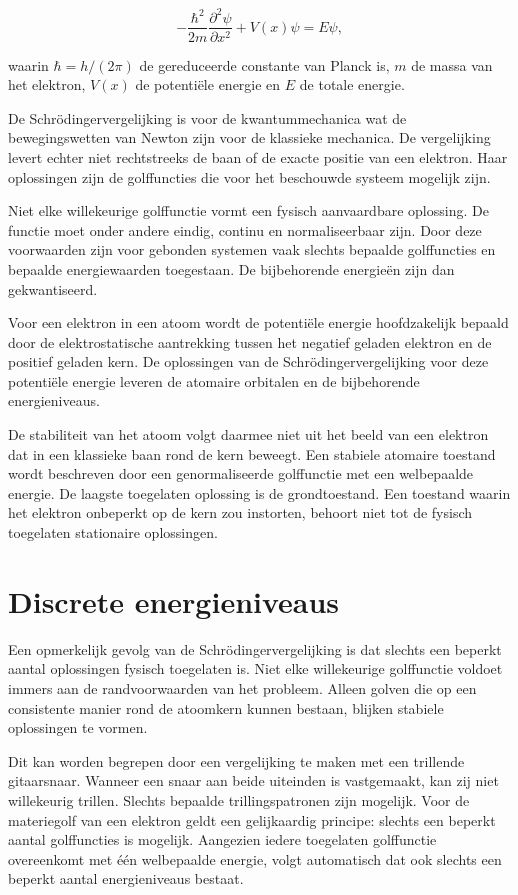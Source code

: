 \begin{equation}
\boxed{
-\frac{\hbar^2}{2m}
\frac{\partial^2\psi}{\partial x^2}
+
V(x)\psi
=
E\psi,
}
\end{equation}

waarin $\hbar=h/(2\pi)$ de gereduceerde constante van Planck is, $m$ de massa van het elektron, $V(x)$ de potentiële energie en $E$ de totale energie.

De Schr\"odingervergelijking is voor de kwantummechanica wat de bewegingswetten van Newton zijn voor de klassieke mechanica. De vergelijking levert echter niet rechtstreeks de baan of de exacte positie van een elektron. Haar oplossingen zijn de golffuncties die voor het beschouwde systeem mogelijk zijn.

Niet elke willekeurige golffunctie vormt een fysisch aanvaardbare oplossing. De functie moet onder andere eindig, continu en normaliseerbaar zijn. Door deze voorwaarden zijn voor gebonden systemen vaak slechts bepaalde golffuncties en bepaalde energiewaarden toegestaan. De bijbehorende energieën zijn dan gekwantiseerd.

Voor een elektron in een atoom wordt de potentiële energie hoofdzakelijk bepaald door de elektrostatische aantrekking tussen het negatief geladen elektron en de positief geladen kern. De oplossingen van de Schr\"odingervergelijking voor deze potentiële energie leveren de atomaire orbitalen en de bijbehorende energieniveaus.

De stabiliteit van het atoom volgt daarmee niet uit het beeld van een elektron dat in een klassieke baan rond de kern beweegt. Een stabiele atomaire toestand wordt beschreven door een genormaliseerde golffunctie met een welbepaalde energie. De laagste toegelaten oplossing is de grondtoestand. Een toestand waarin het elektron onbeperkt op de kern zou instorten, behoort niet tot de fysisch toegelaten stationaire oplossingen.

\section{Discrete energieniveaus}

Een opmerkelijk gevolg van de Schr\"odingervergelijking is dat slechts een beperkt aantal oplossingen fysisch toegelaten is. Niet elke willekeurige golffunctie voldoet immers aan de randvoorwaarden van het probleem. Alleen golven die op een consistente manier rond de atoomkern kunnen bestaan, blijken stabiele oplossingen te vormen.

Dit kan worden begrepen door een vergelijking te maken met een trillende gitaarsnaar. Wanneer een snaar aan beide uiteinden is vastgemaakt, kan zij niet willekeurig trillen. Slechts bepaalde trillingspatronen zijn mogelijk. Voor de materiegolf van een elektron geldt een gelijkaardig principe: slechts een beperkt aantal golffuncties is mogelijk. Aangezien iedere toegelaten golffunctie overeenkomt met \'e\'en welbepaalde energie, volgt automatisch dat ook slechts een beperkt aantal energieniveaus bestaat.

